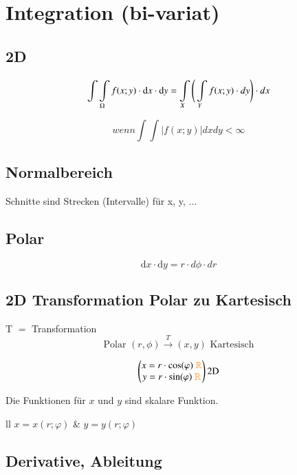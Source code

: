 \section{Integration (bi-variat)}

\subsection{2D}

\[
    \int\int\limits_{\Omega}f(x;y)\cdot \mathop{} \! \mathrm{d} x\cdot \mathop{} \! \mathrm{d} y=\int\limits_{X}\Bigg(\int\limits_{Y}f(x;y)\cdot dy \Bigg)\cdot dx
\]

\[
    wenn\int\int|f(x;y)|dxdy<\infty
\]

\subsection{Normalbereich}

Schnitte sind Strecken (Intervalle) für x, y, ...

\subsection{Polar}

\[
    \text{d}x \cdot \text{d}y = r \cdot d\phi \cdot dr
\]

\subsection{2D Transformation Polar zu Kartesisch}
T $=$ Transformation
\[
    \text{Polar } (r,\phi) \xrightarrow{T} (x,y) \text{ Kartesisch}
\]

\[
\begin{pmatrix}
    x=r\cdot\cos(\varphi) \text{ } {\color{orange}\mathbb{R}} \\
    y=r\cdot\sin(\varphi) \text{ } {\color{orange}\mathbb{R}} 
\end{pmatrix}
\text{2D}
\]

Die Funktionen für $x$ und $y$ sind skalare Funktion.

    \begin{ctabular}{ll}
        $x=x(r;\varphi)$ & $ y=y(r;\varphi)$
    \end{ctabular}

\subsection{Derivative, Ableitung}


\subsection{}
\subsection{}
\subsection{}